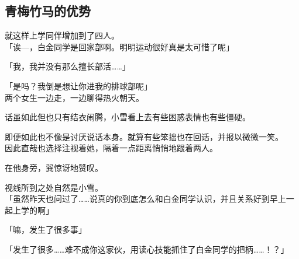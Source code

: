 \subsection{青梅竹马的优势}

就这样上学同伴增加到了四人。\\

「诶—，白金同学是回家部啊。明明运动很好真是太可惜了呢」

「我，我并没有那么擅长部活……」

「是吗？我倒是想让你进我的排球部呢」\\

两个女生一边走，一边聊得热火朝天。

话虽如此但也只有结衣闹腾，小雪看上去有些困惑表情也有些僵硬。

即便如此也不像是讨厌说话本身。就算有些笨拙也在回话，并报以微微一笑。\\

因此直哉也选择注视着她，隔着一点距离悄悄地跟着两人。

在他身旁，巽惊讶地赞叹。

视线所到之处自然是小雪。\\

「虽然昨天也问过了……说真的你到底怎么和白金同学认识，并且关系好到早上一起上学的啊」

「嘛，发生了很多事」

「发生了很多……难不成你这家伙，用读心技能抓住了白金同学的把柄……！？」

